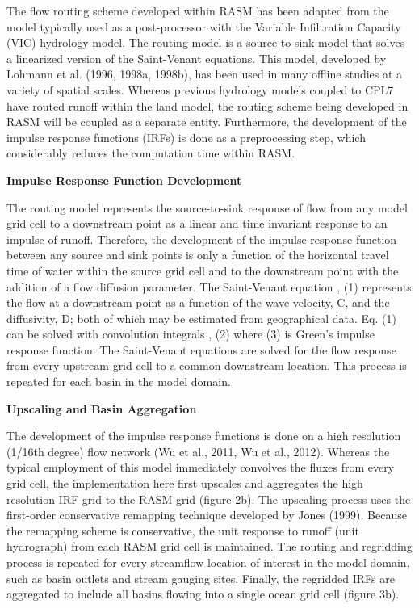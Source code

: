 The flow routing scheme developed within RASM has been adapted from the model typically used as a post-processor with the Variable Infiltration Capacity (VIC) hydrology model. The routing model is a source-to-sink model that solves a linearized version of the Saint-Venant equations. This model, developed by Lohmann et al. (1996, 1998a, 1998b), has been used in many offline studies at a variety of spatial scales.  Whereas previous hydrology models coupled to CPL7 have routed runoff within the land model, the routing scheme being developed in RASM will be coupled as a separate entity. Furthermore, the development of the impulse response functions (IRFs) is done as a preprocessing step, which considerably reduces the computation time within RASM.

\textbf{Impulse Response Function Development}

The routing model represents the source-to-sink response of flow from any model grid cell to a downstream point as a linear and time invariant response to an impulse of runoff.  Therefore, the development of the impulse response function between any source and sink points is only a function of the horizontal travel time of water within the source grid cell and to the downstream point with the addition of a flow diffusion parameter.  The Saint-Venant equation
,							(1)
represents the flow at a downstream point as a function of the wave velocity, C, and the diffusivity, D; both of which may be estimated from geographical data.  Eq. (1) can be solved with convolution integrals
,						(2)	
where
						(3)
is Green’s impulse response function.  The Saint-Venant equations are solved for the flow response from every upstream grid cell to a common downstream location.  This process is repeated for each basin in the model domain.

\textbf{Upscaling and Basin Aggregation}

The development of the impulse response functions is done on a high resolution (1/16th degree) flow network (Wu et al., 2011, Wu et al., 2012).  Whereas the typical employment of this model immediately convolves the fluxes from every grid cell, the implementation here first upscales and aggregates the high resolution IRF grid to the RASM grid (figure 2b). The upscaling process uses the first-order conservative remapping technique developed by Jones (1999). Because the remapping scheme is conservative, the unit response to runoff (unit hydrograph) from each RASM grid cell is maintained. The routing and regridding process is repeated for every streamflow location of interest in the model domain, such as basin outlets and stream gauging sites.  Finally, the regridded IRFs are aggregated to include all basins flowing into a single ocean grid cell (figure 3b).

